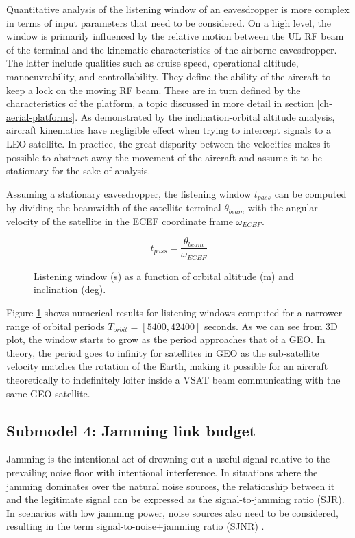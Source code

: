 \documentclass[english, 12pt, a4paper, elec, utf8, a-1b, online]{aaltothesis}
\begin{document}
Quantitative analysis of the listening window of an eavesdropper is more complex in terms of input parameters that need to be considered.
On a high level, the window is primarily influenced by the relative motion between the UL RF beam of the terminal and the kinematic characteristics of the airborne eavesdropper.
The latter include qualities such as cruise speed, operational altitude, manoeuvrability, and controllability.
They define the ability of the aircraft to keep a lock on the moving RF beam.
These are in turn defined by the characteristics of the platform, a topic discussed in more detail in section \ref{ch-aerial-platforms}.
As demonstrated by the inclination-orbital altitude analysis, aircraft kinematics have negligible effect when trying to intercept signals to a LEO satellite.
In practice, the great disparity between the velocities makes it possible to abstract away the movement of the aircraft and assume it to be stationary for the sake of analysis.

Assuming a stationary eavesdropper, the listening window ${t_{pass}}$ can be computed by dividing the beamwidth of the satellite terminal $\theta_{beam}$ with the angular velocity of the satellite in the ECEF coordinate frame $\omega_{ECEF}$.

\begin{equation}
  t_{pass} = \frac{\theta_{beam}}{\omega_{ECEF}}
\end{equation}

\begin{figure}[h]
  \centering
  
  \caption{Listening window (s) as a function of orbital altitude (m) and inclination (deg).}
  \label{fig-listening-window}
\end{figure}

Figure \ref{fig-listening-window} shows numerical results for listening windows computed for a narrower range of orbital periods $T_{orbit} = [5400, 42400]$ seconds.
As we can see from 3D plot, the window starts to grow as the period approaches that of a GEO. In theory, the period goes to infinity for satellites in GEO as the sub-satellite velocity matches the rotation of the Earth, making it possible for an aircraft theoretically to indefinitely loiter inside a VSAT beam communicating with the same GEO satellite.

\subsection{Submodel 4: Jamming link budget} \label{ch-results-submodel-4-link-budget}
Jamming is the intentional act of drowning out a useful signal relative to the prevailing noise floor with intentional interference.
In situations where the jamming dominates over the natural noise sources, the relationship between it and the legitimate signal can be expressed as the signal-to-jamming ratio (SJR).
In scenarios with low jamming power, noise sources also need to be considered, resulting in the term signal-to-noise+jamming ratio (SJNR) \cite{kosola2013digitaalinen}.
\end{document}
